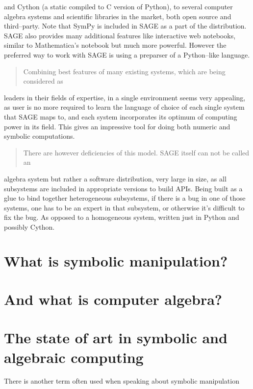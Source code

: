 and Cython (a static compiled to C version of Python), to several computer algebra
systems and scientific libraries in the market, both open source and third--party. Note
that SymPy is included in SAGE as a part of the distribution. SAGE also provides
many additional features like interactive web notebooks, similar to Mathematica's
notebook but much more powerful. However the preferred way to work with SAGE is
using a preparser of a Python--like language.
\begin{quote}

Combining best features of many existing systems, which are being considered as
\end{quote}

leaders in their fields of expertise, in a single environment seems very appealing, as
user is no more required to learn the language of choice of each single system that
SAGE maps to, and each system incorporates its optimum of computing power in its
field. This gives an impressive tool for doing both numeric and symbolic
computations.
\begin{quote}

There are however deficiencies of this model. SAGE itself can not be called an
\end{quote}

algebra system but rather a software distribution, very large in size, as all subsystems
are included in appropriate versions to build APIs. Being built as a glue to bind
together heterogeneous subsystems, if there is a bug in one of those systems, one has
to be an expert in that subsystem, or otherwise it's difficult to fix the bug. As opposed
to a homogeneous system, written just in Python and possibly Cython.


\section{What is symbolic manipulation?}


\section{And what is computer algebra?}


\section{The state of art in symbolic and algebraic computing}

There is another term often used when speaking about symbolic manipulation


